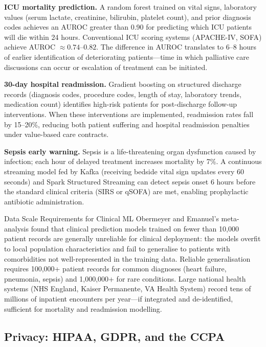 \textbf{ICU mortality prediction.} A random forest trained on vital
signs, laboratory values (serum lactate, creatinine, bilirubin,
platelet count), and prior diagnosis codes achieves an AUROC greater
than 0.90 for predicting which ICU patients will die within 24 hours.
Conventional ICU scoring systems (APACHE-IV, SOFA) achieve AUROC
$\approx 0.74$--$0.82$. The difference in AUROC translates to 6--8 hours
of earlier identification of deteriorating patients---time in which
palliative care discussions can occur or escalation of treatment can be
initiated.

\textbf{30-day hospital readmission.} Gradient boosting on structured
discharge records (diagnosis codes, procedure codes, length of stay,
laboratory trends, medication count) identifies high-risk patients for
post-discharge follow-up interventions. When these interventions are
implemented, readmission rates fall by 15--20\%, reducing both patient
suffering and hospital readmission penalties under value-based care
contracts.

\textbf{Sepsis early warning.} Sepsis is a life-threatening organ
dysfunction caused by infection; each hour of delayed treatment increases
mortality by 7\%. A continuous streaming model fed by Kafka (receiving
bedside vital sign updates every 60 seconds) and Spark Structured
Streaming can detect sepsis onset 6 hours before the standard clinical
criteria (SIRS or qSOFA) are met, enabling prophylactic antibiotic
administration.

\begin{keyinsight}{Data Scale Requirements for Clinical ML}
Obermeyer and Emanuel's meta-analysis found that clinical prediction
models trained on fewer than 10{,}000 patient records are generally
unreliable for clinical deployment: the models overfit to local
population characteristics and fail to generalise to patients with
comorbidities not well-represented in the training data. Reliable
generalisation requires 100{,}000+ patient records for common diagnoses
(heart failure, pneumonia, sepsis) and 1{,}000{,}000+ for rare conditions.
Large national health systems (NHS England, Kaiser Permanente, VA Health
System) record tens of millions of inpatient encounters per year---if
integrated and de-identified, sufficient for mortality and readmission modelling.
\end{keyinsight}

\subsection{Privacy: HIPAA, GDPR, and the CCPA}
\label{subsec:health-privacy}

